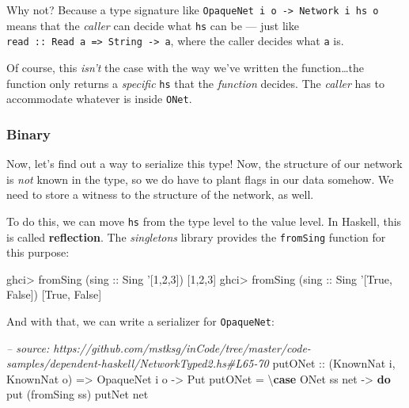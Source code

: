 \documentclass[]{article}
\newenvironment{Shaded}{}{}
\newcommand{\KeywordTok}[1]{\textcolor[rgb]{0.00,0.44,0.13}{\textbf{{#1}}}}
\newcommand{\DataTypeTok}[1]{\textcolor[rgb]{0.56,0.13,0.00}{{#1}}}
\newcommand{\DecValTok}[1]{\textcolor[rgb]{0.25,0.63,0.44}{{#1}}}
\newcommand{\CharTok}[1]{\textcolor[rgb]{0.25,0.44,0.63}{{#1}}}
\newcommand{\CommentTok}[1]{\textcolor[rgb]{0.38,0.63,0.69}{\textit{{#1}}}}
\newcommand{\OtherTok}[1]{\textcolor[rgb]{0.00,0.44,0.13}{{#1}}}
\newcommand{\FunctionTok}[1]{\textcolor[rgb]{0.02,0.16,0.49}{{#1}}}
\newcommand{\NormalTok}[1]{{#1}}
\begin{document}
Why not? Because a type signature like
\texttt{OpaqueNet\ i\ o\ -\textgreater{}\ Network\ i\ hs\ o} means that the
\emph{caller} can decide what \texttt{hs} can be --- just like
\texttt{read\ ::\ Read\ a\ =\textgreater{}\ String\ -\textgreater{}\ a}, where
the caller decides what \texttt{a} is.

Of course, this \emph{isn't} the case with the way we've written the
function\ldots{}the function only returns a \emph{specific} \texttt{hs} that the
\emph{function} decides. The \emph{caller} has to accommodate whatever is inside
\texttt{ONet}.

\subsubsection{Binary}\label{binary}

Now, let's find out a way to serialize this type! Now, the structure of our
network is \emph{not} known in the type, so we do have to plant flags in our
data somehow. We need to store a witness to the structure of the network, as
well.

To do this, we can move \texttt{hs} from the type level to the value level. In
Haskell, this is called \textbf{reflection}. The \emph{singletons} library
provides the \texttt{fromSing} function for this purpose:

\begin{Shaded}
\begin{Highlighting}[]
\NormalTok{ghci}\FunctionTok{>} \NormalTok{fromSing (}\OtherTok{sing ::} \DataTypeTok{Sing} \CharTok{'[1,2,3])}
\NormalTok{[}\DecValTok{1}\NormalTok{,}\DecValTok{2}\NormalTok{,}\DecValTok{3}\NormalTok{]}
\NormalTok{ghci}\FunctionTok{>} \NormalTok{fromSing (}\OtherTok{sing ::} \DataTypeTok{Sing} \CharTok{'[True, False])}
\NormalTok{[}\DataTypeTok{True}\NormalTok{, }\DataTypeTok{False}\NormalTok{]}
\end{Highlighting}
\end{Shaded}

And with that, we can write a serializer for \texttt{OpaqueNet}:

\begin{Shaded}
\begin{Highlighting}[]
\CommentTok{-- source: https://github.com/mstksg/inCode/tree/master/code-samples/dependent-haskell/NetworkTyped2.hs#L65-70}
\OtherTok{putONet ::} \NormalTok{(}\DataTypeTok{KnownNat} \NormalTok{i, }\DataTypeTok{KnownNat} \NormalTok{o)}
        \OtherTok{=>} \DataTypeTok{OpaqueNet} \NormalTok{i o}
        \OtherTok{->} \DataTypeTok{Put}
\NormalTok{putONet }\FunctionTok{=} \NormalTok{\textbackslash{}}\KeywordTok{case} \DataTypeTok{ONet} \NormalTok{ss net }\OtherTok{->} \KeywordTok{do}
                  \NormalTok{put (fromSing ss)}
                  \NormalTok{putNet net}
\end{Highlighting}
\end{Shaded}
\end{document}
